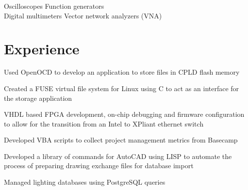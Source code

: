 \documentclass[]{deedy-resume-openfont}
\begin{document}
\begin{minipage}[t]{0.33\textwidth}
\sectionsep %

\textbullet{} Oscilloscopes \textbullet{} Function generators \\
\textbullet{} Digital multimeters \textbullet{} Vector network analyzers (VNA) \\

\sectionsep %


%
%

\end{minipage} 
\hfill
\begin{minipage}[t]{0.66\textwidth} 


\section{Experience}
\vspace{\topsep} %
\begin{tightemize}
\item Used OpenOCD to develop an application to store files in CPLD flash memory
\item Created a FUSE virtual file system for Linux using C to act as an interface for the storage application
\item VHDL based FPGA development, on-chip debugging and firmware configuration to allow for the transition from an Intel to XPliant ethernet switch
\end{tightemize}
\sectionsep

\begin{tightemize}
\item Developed VBA scripts to collect project management metrics from Basecamp
\item Developed a library of commands for AutoCAD using LISP to automate the process of preparing drawing exchange files for database import
\item Managed lighting databases using PostgreSQL queries
\end{tightemize}
\sectionsep


\end{minipage}
\end{document}
